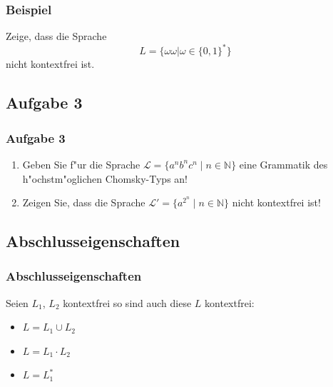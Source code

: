 
\begin{frame}
	\frametitle{Beispiel}
	Zeige, dass die Sprache
	\[L=\{\omega \omega|\omega \in \{0,1\}^*\}\]
	nicht kontextfrei ist.
\end{frame}

\subsection{Aufgabe 3}
\begin{frame}
	\frametitle{Aufgabe 3} %
	\begin{enumerate}
		\item Geben Sie f"ur die Sprache $\mathcal{L} = \{a^nb^nc^n \; | \; n \in
		\mathbb{N}\}$ eine Grammatik des h"ochstm"oglichen Chomsky-Typs an!
		\item Zeigen Sie, dass die Sprache $\mathcal{L}' = \{a^{2^n} \; | \; n \in
		\mathbb{N}\}$ nicht kontextfrei ist!
	\end{enumerate}
\end{frame}

\subsection{Abschlusseigenschaften}
\begin{frame}
	\frametitle{Abschlusseigenschaften}
	Seien $L_1$, $L_2$ kontextfrei so sind auch diese $L$ kontextfrei:
	\begin{itemize}
		\item $L = L_1 \cup L_2$
		\item $L = L_1 \cdot L_2$
		\item $L = L_1^*$
	\end{itemize}
\end{frame}

